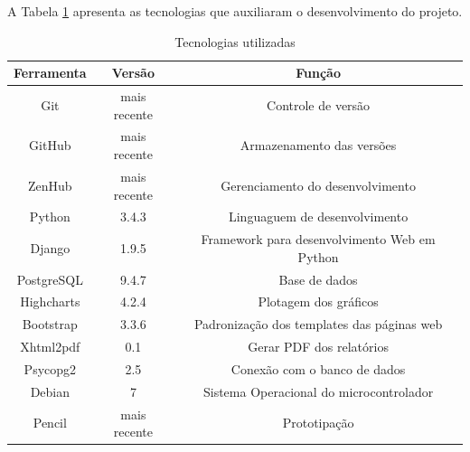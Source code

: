 \newpage
{}
	A Tabela \ref{tab:tech} apresenta as tecnologias que auxiliaram o desenvolvimento do projeto.
	\begin{table}[h]
	\centering
	\caption{Tecnologias utilizadas}
	\label{tab:tech}
	\begin{tabular}{ccc}
	\hline
	\textbf{Ferramenta}              & \textbf{Versão}                   & \textbf{Função}                                                   \\ \hline
	\multicolumn{1}{|c|}{Git}        & \multicolumn{1}{c|}{mais recente} & \multicolumn{1}{c|}{Controle de versão}                           \\ \hline
	\multicolumn{1}{|c|}{GitHub}     & \multicolumn{1}{c|}{mais recente} & \multicolumn{1}{c|}{Armazenamento das versões}                    \\ \hline
	\multicolumn{1}{|c|}{ZenHub}     & \multicolumn{1}{c|}{mais recente} & \multicolumn{1}{c|}{Gerenciamento do desenvolvimento}             \\ \hline
	\multicolumn{1}{|c|}{Python}     & \multicolumn{1}{c|}{3.4.3}        & \multicolumn{1}{c|}{Linguaguem de desenvolvimento}                \\ \hline
	\multicolumn{1}{|c|}{Django}     & \multicolumn{1}{c|}{1.9.5}        & \multicolumn{1}{c|}{Framework para desenvolvimento Web em Python} \\ \hline
	\multicolumn{1}{|c|}{PostgreSQL} & \multicolumn{1}{c|}{9.4.7}        & \multicolumn{1}{c|}{Base de dados}                                \\ \hline
	\multicolumn{1}{|c|}{Highcharts} & \multicolumn{1}{c|}{4.2.4}        & \multicolumn{1}{c|}{Plotagem dos gráficos}                        \\ \hline
	\multicolumn{1}{|c|}{Bootstrap}  & \multicolumn{1}{c|}{3.3.6}        & \multicolumn{1}{c|}{Padronização dos templates das páginas web}   \\ \hline
	\multicolumn{1}{|c|}{Xhtml2pdf}  & \multicolumn{1}{c|}{0.1}          & \multicolumn{1}{c|}{Gerar PDF dos relatórios}                     \\ \hline
	\multicolumn{1}{|c|}{Psycopg2}   & \multicolumn{1}{c|}{2.5}          & \multicolumn{1}{c|}{Conexão com o banco de dados}                 \\ \hline
	\multicolumn{1}{|c|}{Debian}     & \multicolumn{1}{c|}{7}            & \multicolumn{1}{c|}{Sistema Operacional do microcontrolador}      \\ \hline
	\multicolumn{1}{|c|}{Pencil}     & \multicolumn{1}{c|}{mais recente} & \multicolumn{1}{c|}{Prototipação}                                 \\ \hline
	\end{tabular}
	\end{table}


